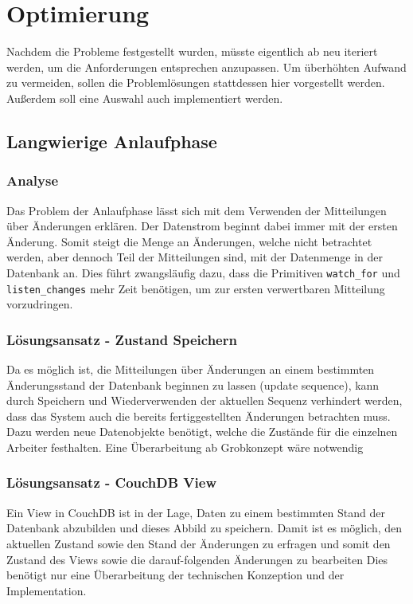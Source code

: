 \chapter{Optimierung}
\label{cha:opt}
Nachdem die Probleme festgestellt wurden,
müsste eigentlich ab  neu iteriert werden,
um die Anforderungen entsprechen anzupassen.
Um überhöhten Aufwand zu vermeiden,
sollen die Problemlösungen stattdessen hier vorgestellt werden.
Außerdem soll eine Auswahl auch implementiert werden.

\section{Langwierige Anlaufphase}
\label{cha:opt:anlaufphase}
\subsection{Analyse}

Das Problem der Anlaufphase lässt sich mit dem Verwenden der Mitteilungen über Änderungen erklären. Der Datenstrom beginnt dabei immer mit der ersten Änderung.
Somit steigt die Menge an Änderungen, welche nicht betrachtet werden, aber dennoch Teil der Mitteilungen sind, mit der Datenmenge in der Datenbank an.
Dies führt zwangsläufig dazu, dass die Primitiven \verb|watch_for| und \verb|listen_changes| mehr Zeit benötigen, um zur ersten verwertbaren Mitteilung vorzudringen.


\subsection{Lösungsansatz - Zustand Speichern}

Da es möglich ist, die Mitteilungen über Änderungen an einem bestimmten Änderungsstand der Datenbank beginnen zu lassen (update sequence),
kann durch Speichern und Wiederverwenden der aktuellen Sequenz verhindert werden,
dass das System auch die bereits fertiggestellten Änderungen betrachten muss.
Dazu werden neue Datenobjekte benötigt, welche die Zustände für die einzelnen Arbeiter festhalten. Eine Überarbeitung ab Grobkonzept wäre notwendig


\subsection{Lösungsansatz - CouchDB View}

Ein View in CouchDB ist in der Lage, Daten zu einem bestimmten Stand der Datenbank abzubilden und dieses Abbild zu speichern.
Damit ist es möglich, den aktuellen Zustand sowie den Stand der Änderungen zu erfragen und somit den Zustand des Views sowie die darauf-folgenden Änderungen zu bearbeiten 
Dies benötigt nur eine Überarbeitung der technischen Konzeption und der Implementation.

